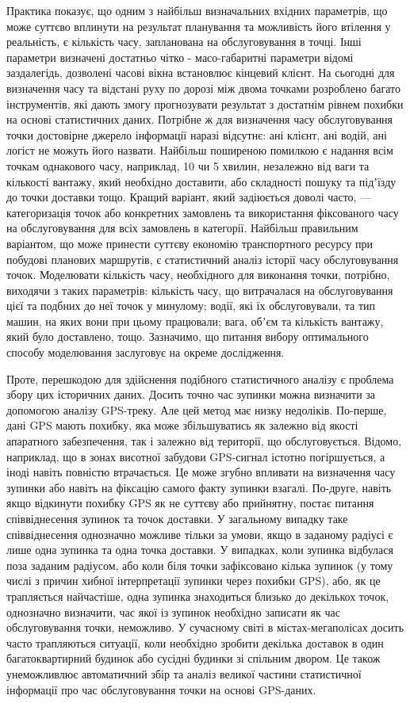 Практика показує, що одним з найбільш визначальних вхідних параметрів, що може суттєво вплинути на результат планування та можливість його втілення у  реальність, є кількість часу, запланована на обслуговування в точці. Інші параметри визначені  достатньо чітко - масо-габаритні параметри відомі заздалегідь, дозволені часові вікна встановлює кінцевий клієнт. На сьогодні для визначення часу та відстані руху по дорозі між двома точками розроблено багато інструментів, які дають змогу прогнозувати результат з достатнім рівнем похибки на основі статистичних даних. Потрібне ж для визначення часу обслуговування точки достовірне джерело інформації наразі відсутнє: ані клієнт, ані водій, ані логіст не можуть його назвати. Найбільш поширеною помилкою є надання всім точкам однакового часу, наприклад, 10 чи 5  хвилин, незалежно від ваги та кількості вантажу, який необхідно доставити, або складності пошуку та підʼїзду до точки доставки тощо. Кращий варіант, який задіюється доволі часто, --- категоризація точок або конкретних замовлень та використання фіксованого часу на обслуговування для всіх замовлень в категорії. Найбільш правильним варіантом, що може принести суттєву економію транспортного ресурсу при побудові планових маршрутів, є статистичний аналіз історії часу обслуговування точок. Моделювати кількість часу, необхідного для виконання точки, потрібно, виходячи з таких параметрів: кількість часу, що витрачалася на обслуговування цієї та подбних до неї точок у минулому; водії, які їх  обслуговували, та тип машин, на яких вони при цьому працювали; вага, обʼєм та кількість вантажу, який було доставлено, тощо. Зазначимо, що питання вибору оптимального способу моделювання заслуговує на окреме дослідження.

Проте, перешкодою для здійснення подібного статистичного аналізу є проблема збору цих історичних даних. Досить точно час зупинки можна визначити за допомогою аналізу GPS-треку. Але цей метод має низку недоліків. По-перше, дані GPS мають похибку, яка може збільшуватись як залежно від якості апаратного забезпечення, так і залежно від території, що обслуговується. Відомо, наприклад, що в зонах висотної забудови GPS-сигнал істотно погіршується, а іноді навіть повністю втрачається. Це може згубно впливати на визначення часу зупинки або навіть на фіксацію самого факту зупинки взагалі. По-друге, навіть якщо відкинути похибку GPS як не суттєву або прийнятну, постає питання співвіднесення зупинок та точок доставки. У загальному випадку таке співвіднесення однозначно можливе тільки за умови, якщо в заданому радіусі є лише одна зупинка та одна точка доставки. У випадках, коли зупинка відбулася поза заданим радіусом, або коли біля точки зафіксовано кілька зупинок (у тому числі з причин хибної інтерпретації зупинки через похибки GPS), або, як це трапляється найчастіше, одна зупинка знаходиться близько до декількох точок, однозначно визначити, час якої із зупинок необхідно записати як час обслуговування точки, неможливо. У сучасному світі в містах-мегаполісах досить часто трапляються ситуації, коли необхідно зробити декілька доставок в один багатоквартирний будинок або сусідні будинки зі спільним двором. Це також унеможливлює автоматичний збір та аналіз великої частини статистичної інформації про час обслуговування точки на основі GPS-даних.

